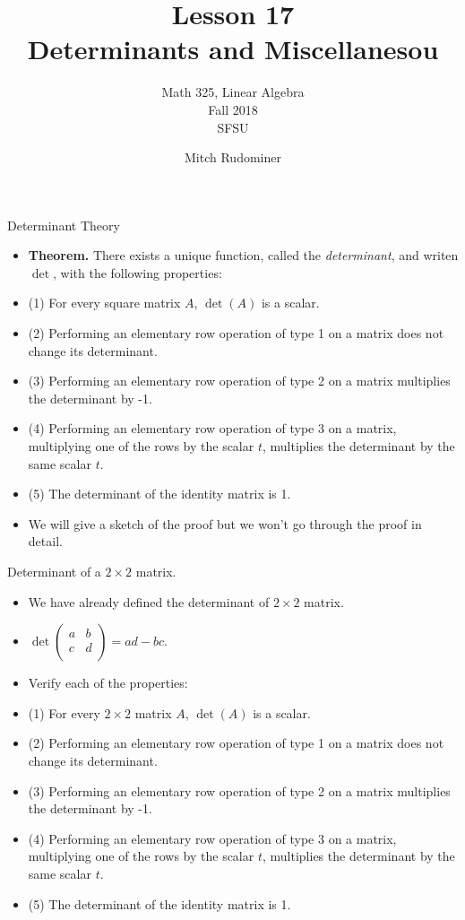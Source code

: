 \documentclass{beamer}
\title{Lesson 17 \\ Determinants and Miscellanesou}
\subtitle{Math 325, Linear Algebra \\ Fall 2018 \\ SFSU}
\author{Mitch Rudominer}
\date{}
\begin{document}
\begin{frame}
  \titlepage
\end{frame}


\begin{frame}{Determinant Theory}

\begin{itemize}
\item \textbf{Theorem.} There exists a unique function, called the \emph{determinant}, and writen $\det$, with the following properties:
\item (1) For every square matrix $A$, $\det(A)$ is a scalar.
\item (2) Performing an elementary row operation of type 1 on a matrix does not change its determinant.
\item (3) Performing an elementary row operation of type 2 on a matrix multiplies the determinant by -1.
\item (4) Performing an elementary row operation of type 3 on a matrix, multiplying one of the rows by the scalar $t$,
multiplies the determinant by the same scalar $t$.
\item (5) The determinant of the identity matrix is 1.
\item We will give a sketch of the proof but we won't go through the proof in detail.
\end{itemize}
\end{frame}


\begin{frame}{Determinant of a $2\times 2$ matrix.}

\begin{itemize}
\item We have already defined the determinant of $2\times 2$ matrix.
\item
$
\det
\begin{pmatrix}
a & b \\
c & d \\
\end{pmatrix}
= ad - bc
$.
\item Verify each of the properties:
\item (1) For every $2\times 2$ matrix $A$, $\det(A)$ is a scalar.
\item (2) Performing an elementary row operation of type 1 on a matrix does not change its determinant.
\item (3) Performing an elementary row operation of type 2 on a matrix multiplies the determinant by -1.
\item (4) Performing an elementary row operation of type 3 on a matrix, multiplying one of the rows by the scalar $t$,
multiplies the determinant by the same scalar $t$.
\item (5) The determinant of the identity matrix is 1.
\end{itemize}
\end{frame}
\end{document}
